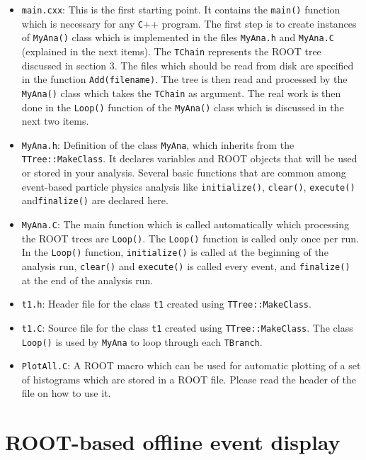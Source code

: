 \documentclass[12pt,letterpaper]{article}
\begin{document}
\begin{itemize}
\item  \verb+main.cxx+: This is the first starting point. It contains the \verb+main()+ function which is necessary for any \verb+C+++ program. The first step is to create instances of \verb+MyAna()+ class which is implemented in the files \verb+MyAna.h+ and \verb+MyAna.C+ (explained in the next items). The \verb+TChain+ represents the ROOT tree discussed in section 3. The files which should be read from disk are specified in the function \verb+Add(filename)+. The tree is then read and processed by the \verb+MyAna()+ class which takes the \verb+TChain+ as argument. The real work is then done in the \verb+Loop()+ function of the \verb+MyAna()+ class which is discussed in the next two items. 

\item \verb+MyAna.h+: Definition of the class \verb+MyAna+, which inherits from the \verb+TTree::MakeClass+. It declares variables and ROOT objects that will be used or stored in your analysis. Several basic functions that are common among event-based particle physics analysis like \verb+initialize()+, \verb+clear()+, \verb+execute()+ and\verb+finalize()+ are declared here.
\item \verb+MyAna.C+: The main function which is called automatically which processing the ROOT trees are \verb+Loop()+. The \verb+Loop()+ function is called only once per run. In the \verb+Loop()+ function, \verb+initialize()+ is called at the beginning of the analysis run, \verb+clear()+ and \verb+execute()+ is called every event, and \verb+finalize()+ at the end of the analysis run.

\item \verb+t1.h+: Header file for the class \verb+t1+ created using \verb+TTree::MakeClass+.  

\item \verb+t1.C+: Source file for the class \verb+t1+ created using \verb+TTree::MakeClass+. The class \verb+Loop()+ is used by \verb+MyAna+ to loop through each \verb+TBranch+.

\item \verb+PlotAll.C+: A ROOT macro which can be used for automatic plotting of a set of histograms which are stored in a ROOT file. Please read the header of the file on how to use it. 
\end{itemize}


\section{ROOT-based offline event display}
\end{document}
